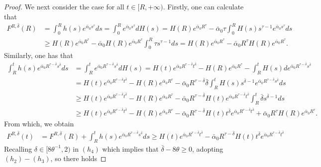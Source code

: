\documentclass[11pt]{amsart}
\numberwithin{equation}{section}
\theoremstyle{definition}
\begin{document}
\begin{proof}
We next consider the case for all $t\in[R,+\infty)$.
Firstly, one can calculate that
\begin{align*}
  F^{R,\bar{\delta}}(R) &= \int_{0}^{R}h(s)e^{\bar{\alpha}_0 s^{\tau}} ds = \int_{0}^{R} e^{\bar{\alpha}_0 s^{\tau}} dH(s)
  =H(R)e^{\bar{\alpha}_0 R^{\tau}} -\bar{\alpha}_0\tau \int_{0}^{R} H(s)s^{\tau-1}e^{\bar{\alpha}_0 s^{\tau}}ds \\
   & \geq  H(R)e^{\bar{\alpha}_0 R^{\tau}} -\bar{\alpha}_0 H(R)e^{\bar{\alpha}_0 R^{\tau}}\int_{0}^{R}\tau s^{\tau-1}ds
   =H(R)e^{\bar{\alpha}_0 R^{\tau}} -\bar{\alpha}_0 R^{\tau}H(R)e^{\bar{\alpha}_0 R^{\tau}}.
\end{align*}
Similarly, one has that
 \begin{align*}
 \int_{R}^{t}h(s)e^{\bar{\alpha}_0 R^{\tau-\bar{\delta}}s^{\bar{\delta}}}ds& =
\int_{R}^{t}e^{\bar{\alpha}_0 R^{\tau-\bar{\delta}}s^{\bar{\delta}}}dH(s)
=H(t)e^{\bar{\alpha}_0 R^{\tau-\bar{\delta}}t^{\bar{\delta}}}-H(R)e^{\bar{\alpha}_0 R^{\tau}}
-\int_{R}^{t}H(s)de^{\bar{\alpha}_0 R^{\tau-\bar{\delta}}s^{\bar{\delta}}} \\
   & =H(t)e^{\bar{\alpha}_0 R^{\tau-\bar{\delta}}t^{\bar{\delta}}}-H(R)e^{\bar{\alpha}_0 R^{\tau}}
-\bar{\alpha}_0 R^{\tau-\bar{\delta}}\bar{\delta}\int_{R}^{t}H(s)s^{\bar{\delta}-1}e^{\bar{\alpha}_0 R^{\tau-\bar{\delta}}s^{\bar{\delta}}}ds\\
&\geq H(t)e^{\bar{\alpha}_0 R^{\tau-\bar{\delta}}t^{\bar{\delta}}}-H(R)e^{\bar{\alpha}_0 R^{\tau}}
-\bar{\alpha}_0  R^{\tau-\bar{\delta}}H(t)e^{\bar{\alpha}_0 R^{\tau-\bar{\delta}}t^{\bar{\delta} }}\int_{R}^{t}\bar{\delta}s^{\bar{\delta}-1}ds\\
&\geq H(t)e^{\bar{\alpha}_0 R^{\tau-\bar{\delta}}t^{\bar{\delta}}}-H(R)e^{\bar{\alpha}_0 R^{\tau}}
-\bar{\alpha}_0  R^{\tau-\bar{\delta}}H(t)t^{\bar{\delta} }e^{\bar{\alpha}_0 R^{\tau-\bar{\delta}}t^{\bar{\delta} }}
+\bar{\alpha}_0  R^{\tau}H(R)e^{\bar{\alpha}_0 R^{\tau}}.
\end{align*}
From which, we obtain
\begin{align*}
 F^{R,\bar{\delta}}(t) & =F^{R,\bar{\delta}}(R)+ \int_{R}^{t}h(s)e^{\bar{\alpha}_0 R^{\tau-\bar{\delta}}s^{\bar{\delta}}}ds
  \geq H(t)e^{\bar{\alpha}_0 R^{\tau-\bar{\delta}}t^{\bar{\delta}}}
 -\bar{\alpha}_0  R^{\tau-\bar{\delta}}H(t)t^{\bar{\delta} }e^{\bar{\alpha}_0 R^{\tau-\bar{\delta}}t^{\bar{\delta} }}
\end{align*}
Recalling $\delta \in [8\theta^{-1},2)$ in $(h_4)$ which implies that $\bar{\delta} -8\theta\geq0$, adopting $(h_2)-(h_3)$,
 so there holds

\end{proof}
\end{document}
